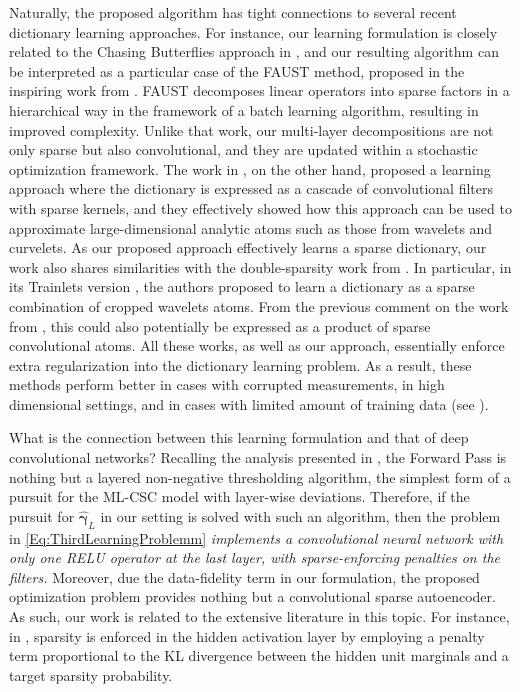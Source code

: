 \documentclass[10pt,journal]{IEEEtran}
\def\gama{{\boldsymbol \gamma}}
\theoremstyle{plain}
\theoremstyle{definition}
\begin{document}
Naturally, the proposed algorithm has tight connections to several recent dictionary learning approaches. For instance, our learning formulation is closely related to the Chasing Butterflies approach in \cite{Lemagoarou15}, and our resulting algorithm can be interpreted as a particular case of the FAUST method, proposed in the inspiring work from \cite{le2016flexible}. FAUST decomposes linear operators into sparse factors in a hierarchical way in the framework of a batch learning algorithm, resulting in improved complexity. Unlike that work, our multi-layer decompositions are not only sparse but also convolutional, and they are updated within a stochastic optimization framework. %
The work in \cite{Chabiron2013}, on the other hand, proposed a learning approach where the dictionary is expressed as a cascade of convolutional filters with sparse kernels, and they effectively showed how this approach can be used to approximate large-dimensional analytic atoms such as those from wavelets and curvelets. 
As our proposed approach effectively learns a sparse dictionary, our work also shares similarities with the double-sparsity work from \cite{Rubinstein2010}. In particular, in its Trainlets version \cite{Sulam2016}, the authors proposed to learn a dictionary as a sparse combination of cropped wavelets atoms. From the previous comment on the work from \cite{Chabiron2013}, this could also potentially be expressed as a product of sparse convolutional atoms. All these works, as well as our approach, essentially enforce extra regularization into the dictionary learning problem. As a result, these methods perform better in cases with corrupted measurements, in high dimensional settings, and in cases with limited amount of training data (see \cite{Rubinstein2010,Sulam2016}). 

What is the connection between this learning formulation and that of deep convolutional networks? Recalling the analysis presented in \cite{Papyan2016convolutional}, the Forward Pass is nothing but a layered non-negative thresholding algorithm, the simplest form of a pursuit for the ML-CSC model with layer-wise deviations. Therefore, if the pursuit for $\hat{\gama}_L$ in our setting is solved with such an algorithm, then the problem in \eqref{Eq:ThirdLearningProblemm} \emph{implements a convolutional neural network with only one RELU operator at the last layer, with sparse-enforcing penalties on the filters.} Moreover, due the data-fidelity term in our formulation, the proposed optimization problem provides nothing but a convolutional sparse autoencoder. As such, our work is related to the extensive literature in this topic. For instance, in \cite{ng2011sparse}, sparsity is enforced in the hidden activation layer by employing a penalty term proportional to the KL divergence between the hidden unit marginals and a target sparsity probability. 
\end{document}
